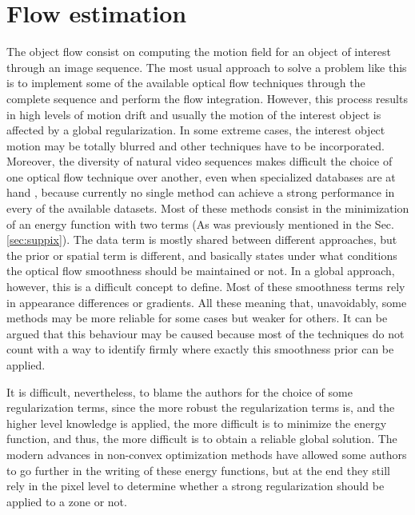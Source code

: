 \section{Flow estimation}
\label{sec:core}

The object flow consist on computing the motion field for an object of interest through an image
sequence. The most usual approach to solve a problem like this is to implement some of the available
optical flow techniques through the complete sequence and perform the flow integration. 
However, this process results in high levels of motion drift \cite{c18}\cite{c19} and usually the motion of the interest
object is affected by a global regularization. In some extreme cases, the interest object motion
may be totally blurred and other techniques have to be incorporated. Moreover, the diversity
of natural video sequences makes difficult the choice of one optical flow technique over another, even when specialized
databases are at hand \cite{c17}, because currently no single method can achieve a strong 
performance in every of the available datasets. Most of these methods consist in the minimization 
of an energy function with two terms (As was previously mentioned in the Sec. \ref{sec:suppix}). The data
term is mostly shared between different approaches, but the prior or spatial term is different, and basically states 
under what conditions the optical flow smoothness should be maintained or not. In a global approach, however,
this is a difficult concept to define. Most of these smoothness terms rely in appearance differences or gradients.
All these meaning that, unavoidably, some methods may be more reliable for some cases but weaker for others. 
It can be argued that this behaviour may be caused because most of the techniques do not count with a way to identify 
firmly where exactly this smoothness prior can be applied. 

It is difficult, nevertheless, to blame the authors for the choice of some regularization 
terms, since the more robust the regularization terms is, and the higher level knowledge is applied, the more difficult is to minimize the 
energy function, and thus, the more difficult is to obtain a reliable global solution. 
The modern advances in non-convex optimization methods have allowed some authors 
to go further in the writing of these energy functions, but at the end they still rely in the pixel level to determine whether a strong regularization 
should be applied to a zone or not.


